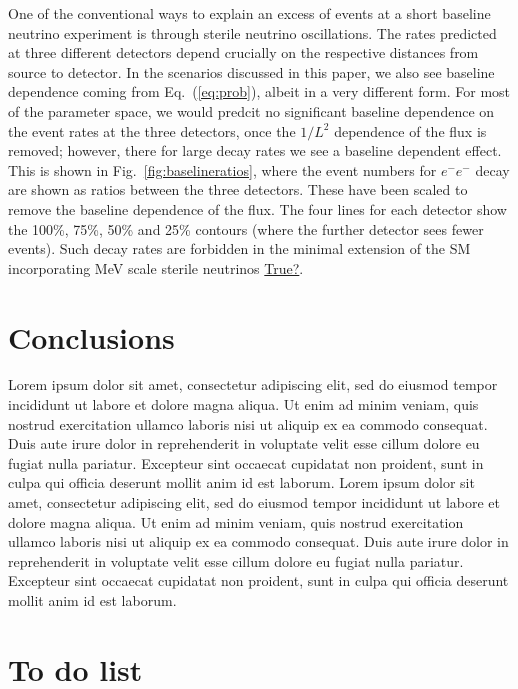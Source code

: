 \documentclass[11pt, a4paper]{article}
\newcommand{\refeq}[1]{Eq.~(\ref{#1})}
\newcommand{\reffig}[1]{Fig.~\ref{#1}}
\newcommand{\lorem}{ \textcolor[rgb]{0.8,0.8,0.8}{Lorem ipsum dolor sit amet, consectetur
adipiscing elit, sed do eiusmod tempor incididunt ut labore et dolore magna
aliqua. Ut enim ad minim veniam, quis nostrud exercitation ullamco laboris nisi
ut aliquip ex ea commodo consequat. Duis aute irure dolor in reprehenderit in
voluptate velit esse cillum dolore eu fugiat nulla pariatur. Excepteur sint
occaecat cupidatat non proident, sunt in culpa qui officia deserunt mollit anim
id est laborum.}}
\newcommand{\newtext}[2]{\textcolor{#1}{\ul{#2}}}
\begin{document}
One of the conventional ways to explain an excess of events at a short baseline
neutrino experiment is through sterile neutrino oscillations. The rates
predicted at three different detectors depend crucially on the respective
distances from source to detector. In the scenarios discussed in this paper, we
also see baseline dependence coming from \refeq{eq:prob}, albeit in a very
different form. For most of the parameter space, we would predcit no
significant baseline dependence on the event rates at the three detectors, once
the $1/L^2$ dependence of the flux is removed; however, there for large decay
rates we see a baseline dependent effect. This is shown in
\reffig{fig:baselineratios}, where the event numbers for $e^-e^-$ decay are
shown as ratios between the three detectors. These have been scaled to remove
the baseline dependence of the flux.  The four lines for each detector show the
100\%, 75\%, 50\% and 25\% contours (where the further detector sees fewer
events). Such decay rates are forbidden in the minimal extension of the SM
incorporating MeV scale sterile neutrinos \newtext{PB}{True?}.  



\section{Conclusions}
\lorem\lorem


\newpage 

\section{To do list}
\end{document}
